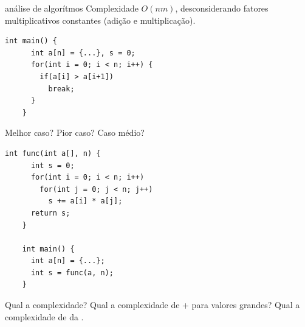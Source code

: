 \documentclass{beamer}
\begin{document}
\begin{frame}{análise de algorítmos}
  Complexidade $O(nm)$, desconsiderando fatores multiplicativos
  constantes (adição e multiplicação).

  \framebreak

  \begin{lstlisting}[style=normalc]
    int main() {
      int a[n] = {...}, s = 0;
      for(int i = 0; i < n; i++) {
        if(a[i] > a[i+1])
          break;
      }
    }
  \end{lstlisting}
  
  Melhor caso? Pior caso? Caso médio?

  \framebreak

  \begin{lstlisting}[style=normalc]
    int func(int a[], n) {
      int s = 0;
      for(int i = 0; i < n; i++) 
        for(int j = 0; j < n; j++) 
          s += a[i] * a[j];
      return s;
    }
    
    int main() {
      int a[n] = {...};
      int s = func(a, n);
    }
  \end{lstlisting}
  
  Qual a complexidade? Qual a complexidade de + para valores grandes?
  Qual a complexidade de  da .
  
  
\end{frame}
\end{document}
